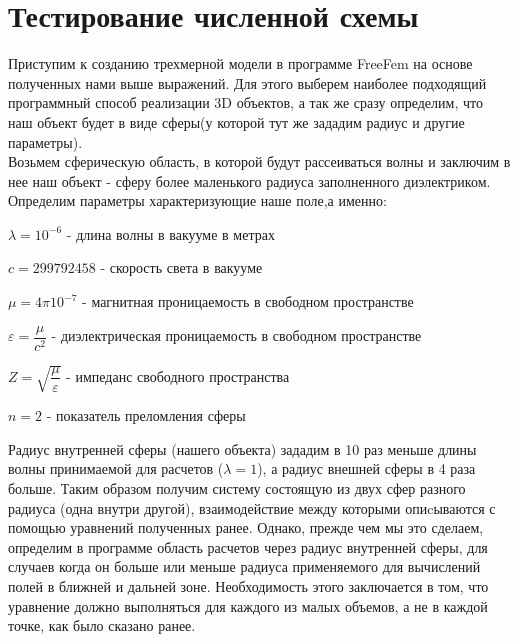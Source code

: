 \section{Тестирование численной схемы}
Приступим к созданию трехмерной модели в программе FreeFem на основе полученных нами выше выражений.  Для этого выберем наиболее подходящий программный способ реализации 3D объектов, а так же сразу определим, что наш объект будет в виде сферы(у которой тут же зададим радиус и другие параметры). 
\\
Возьмем сферическую область, в которой будут рассеиваться волны и заключим в нее наш объект - сферу более маленького радиуса заполненного диэлектриком.
\\
Определим параметры характеризующие наше поле,а именно:
 \\
\begin{flushleft}
	$ \lambda = 10^{-6} $ - длина волны в вакууме в метрах \\
\end{flushleft}
\begin{flushleft}
	$ c = 299792458 $ - скорость света в вакууме \\
\end{flushleft}
\begin{flushleft}
	$ \mu = 4\pi 10^{-7} $ - магнитная проницаемость в свободном пространстве \\
\end{flushleft}
\begin{flushleft}
	$ \varepsilon = \dfrac{\mu}{c^{2}} $ - диэлектрическая проницаемость в свободном пространстве \\
\end{flushleft}
\begin{flushleft}
	$ Z = \sqrt{\dfrac{\mu}{\varepsilon}} $ - импеданс свободного пространства \\
\end{flushleft}
\begin{flushleft}
	$ n = 2 $ - показатель преломления сферы \\
\end{flushleft}
Радиус внутренней сферы (нашего объекта) зададим в 10 раз меньше длины волны принимаемой для расчетов ($ \lambda = 1 $), а радиус внешней сферы в 4 раза больше. Таким образом получим систему состоящую из двух сфер разного радиуса (одна внутри другой), взаимодействие между которыми опиcываются с помощью уравнений полученных ранее. Однако, прежде чем мы это сделаем, определим в программе область расчетов через радиус внутренней сферы, для случаев когда он больше или меньше радиуса применяемого для вычислений полей в ближней и дальней зоне. Необходимость этого заключается в том, что уравнение должно выполняться для каждого из малых объемов, а не в каждой точке, как было сказано ранее.
